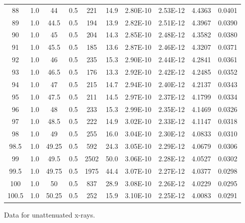 \begin{maintable}[ht]
\begin{tabular}{cccccccccc}
88          & 1.0   & 44         & 0.5           & 221     & 14.9       & 2.80E-10    & 2.53E-12       & 4.4363    & 0.0401       \\
89          & 1.0   & 44.5       & 0.5           & 194     & 13.9       & 2.82E-10    & 2.51E-12       & 4.3967    & 0.0390       \\
90          & 1.0   & 45         & 0.5           & 204     & 14.3       & 2.85E-10    & 2.48E-12       & 4.3582    & 0.0380       \\
91          & 1.0   & 45.5       & 0.5           & 185     & 13.6       & 2.87E-10    & 2.46E-12       & 4.3207    & 0.0371       \\
92          & 1.0   & 46         & 0.5           & 235     & 15.3       & 2.90E-10    & 2.44E-12       & 4.2841    & 0.0361       \\
93          & 1.0   & 46.5       & 0.5           & 176     & 13.3       & 2.92E-10    & 2.42E-12       & 4.2485    & 0.0352       \\
94          & 1.0   & 47         & 0.5           & 215     & 14.7       & 2.94E-10    & 2.40E-12       & 4.2137    & 0.0343       \\
95          & 1.0   & 47.5       & 0.5           & 211     & 14.5       & 2.97E-10    & 2.37E-12       & 4.1799    & 0.0334       \\
96          & 1.0   & 48         & 0.5           & 233     & 15.3       & 2.99E-10    & 2.35E-12       & 4.1469    & 0.0326       \\
97          & 1.0   & 48.5       & 0.5           & 222     & 14.9       & 3.02E-10    & 2.33E-12       & 4.1147    & 0.0318       \\
98          & 1.0   & 49         & 0.5           & 255     & 16.0       & 3.04E-10    & 2.30E-12       & 4.0833    & 0.0310       \\
98.5        & 1.0   & 49.25      & 0.5           & 592     & 24.3       & 3.05E-10    & 2.29E-12       & 4.0679    & 0.0306       \\
99          & 1.0   & 49.5       & 0.5           & 2502    & 50.0       & 3.06E-10    & 2.28E-12       & 4.0527    & 0.0302       \\
99.5        & 1.0   & 49.75      & 0.5           & 1975    & 44.4       & 3.07E-10    & 2.27E-12       & 4.0377    & 0.0298       \\
100         & 1.0   & 50         & 0.5           & 837     & 28.9       & 3.08E-10    & 2.26E-12       & 4.0229    & 0.0295       \\
100.5       & 1.0   & 50.25      & 0.5           & 252     & 15.9       & 3.10E-10    & 2.25E-12       & 4.0083    & 0.0291       \\
\end{tabular}
\caption{Data for unattenuated x-rays.}
\label{tab:xrcg2}
\end{maintable}



